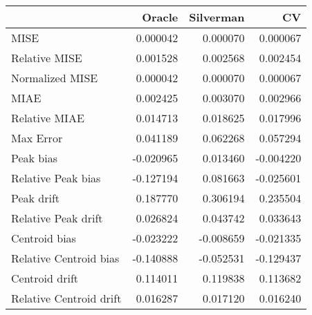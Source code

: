 \begin{tabular}{lrrr}
  \hline
 & Oracle & Silverman & CV \\ 
  \hline
MISE & 0.000042 & 0.000070 & 0.000067 \\ 
  Relative MISE & 0.001528 & 0.002568 & 0.002454 \\ 
  Normalized MISE & 0.000042 & 0.000070 & 0.000067 \\ 
  MIAE & 0.002425 & 0.003070 & 0.002966 \\ 
  Relative MIAE & 0.014713 & 0.018625 & 0.017996 \\ 
  Max Error & 0.041189 & 0.062268 & 0.057294 \\ 
  Peak bias & -0.020965 & 0.013460 & -0.004220 \\ 
  Relative Peak bias & -0.127194 & 0.081663 & -0.025601 \\ 
  Peak drift & 0.187770 & 0.306194 & 0.235504 \\ 
  Relative Peak drift & 0.026824 & 0.043742 & 0.033643 \\ 
  Centroid bias & -0.023222 & -0.008659 & -0.021335 \\ 
  Relative Centroid bias & -0.140888 & -0.052531 & -0.129437 \\ 
  Centroid drift & 0.114011 & 0.119838 & 0.113682 \\ 
  Relative Centroid drift & 0.016287 & 0.017120 & 0.016240 \\ 
   \hline
\end{tabular}
